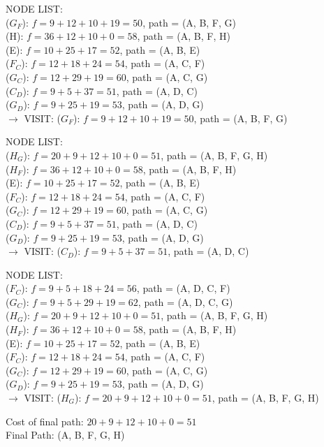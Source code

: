 \documentclass[12pt]{article}
\begin{document}
\clearpage
\noindent
NODE LIST:\\
($G_F$): $f=9+12+10+19=50$, path = (A, B, F, G)\\
(H): $f=36+12+10+0=58$, path = (A, B, F, H)\\
(E): $f=10+25+17=52$, path = (A, B, E) \\
($F_C$): $f=12+18+24=54$, path = (A, C, F)\\
($G_C$): $f=12+29+19=60$, path = (A, C, G)\\
($C_D$): $f=9+5+37=51$, path = (A, D, C)\\
($G_D$): $f=9+25+19=53$, path = (A, D, G)\\
$\rightarrow$ VISIT: ($G_F$): $f=9+12+10+19=50$, path = (A, B, F, G)

\noindent
NODE LIST:\\
($H_G$): $f=20+9+12+10+0=51$, path = (A, B, F, G, H)\\
($H_F$): $f=36+12+10+0=58$, path = (A, B, F, H)\\
(E): $f=10+25+17=52$, path = (A, B, E) \\
($F_C$): $f=12+18+24=54$, path = (A, C, F)\\
($G_C$): $f=12+29+19=60$, path = (A, C, G)\\
($C_D$): $f=9+5+37=51$, path = (A, D, C)\\
($G_D$): $f=9+25+19=53$, path = (A, D, G)\\
$\rightarrow$ VISIT: ($C_D$): $f=9+5+37=51$, path = (A, D, C)

\noindent
NODE LIST:\\
($F_C$): $f=9+5+18+24=56$, path = (A, D, C, F)\\
($G_C$): $f=9+5+29+19=62$, path = (A, D, C, G)\\
($H_G$): $f=20+9+12+10+0=51$, path = (A, B, F, G, H)\\
($H_F$): $f=36+12+10+0=58$, path = (A, B, F, H)\\
(E): $f=10+25+17=52$, path = (A, B, E) \\
($F_C$): $f=12+18+24=54$, path = (A, C, F)\\
($G_C$): $f=12+29+19=60$, path = (A, C, G)\\
($G_D$): $f=9+25+19=53$, path = (A, D, G)\\
$\rightarrow$ VISIT: ($H_G$): $f=20+9+12+10+0=51$, path = (A, B, F, G, H)

\noindent
Cost of final path: $20+9+12+10+0=51$\\
Final Path: (A, B, F, G, H)
\end{document}
